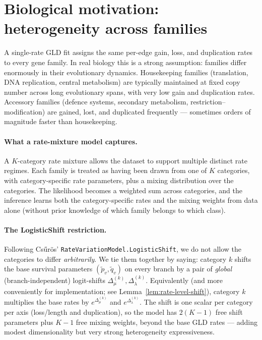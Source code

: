 \documentclass[11pt]{article}
\newcommand{\dup}{\lambda}
\newcommand{\loss}{\mu}
\newcommand{\survp}{\tilde p}
\newcommand{\survq}{\tilde q}
\theoremstyle{definition}
\begin{document}
\section{Biological motivation: heterogeneity across families}
\label{sec:motivation}

A single-rate GLD fit assigns the same per-edge gain, loss, and
duplication rates to every gene family.  In real biology this is a
strong assumption: families differ enormously in their evolutionary
dynamics. Housekeeping families (translation, DNA replication,
central metabolism) are typically maintained at fixed copy number
across long evolutionary spans, with very low gain and duplication
rates. Accessory families (defence systems, secondary metabolism,
restriction--modification) are gained, lost, and duplicated
frequently --- sometimes orders of magnitude faster than housekeeping.

\paragraph{What a rate-mixture model captures.}
A $K$-category rate mixture allows the dataset to support multiple
distinct rate regimes. Each family is treated as having been drawn
from one of $K$ categories, with category-specific rate parameters,
plus a mixing distribution over the categories. The likelihood
becomes a weighted sum across categories, and the inference learns
both the category-specific rates and the mixing weights from data
alone (without prior knowledge of which family belongs to which
class).

\paragraph{The LogisticShift restriction.}
Following Cs\H{u}r\"os' \texttt{RateVariationModel.LogisticShift}, we
do not allow the categories to differ \emph{arbitrarily}. We tie
them together by saying: category $k$ shifts the base survival
parameters $(\survp_v, \survq_v)$ on every branch by a pair of
\emph{global} (branch-independent) logit-shifts $\Delta_\loss^{(k)},
\Delta_\dup^{(k)}$.  Equivalently (and more conveniently for
implementation; see Lemma~\ref{lem:rate-level-shift}), category $k$
multiplies the base rates by $e^{\Delta^{(k)}_\loss}$ and
$e^{\Delta^{(k)}_\dup}$.  The shift is one scalar per category per
axis (loss/length and duplication), so the model has $2(K-1)$ free
shift parameters plus $K-1$ free mixing weights, beyond the base GLD
rates --- adding modest dimensionality but very strong heterogeneity
expressiveness.
\end{document}
